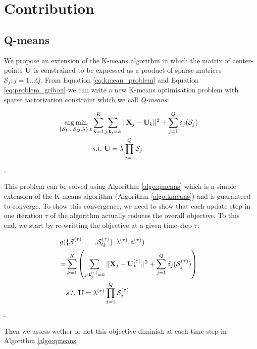 \section{Contribution}
\label{sec:contribution}
\subsection{Q-means}

We propose an extension of the K-means algorithm in which the matrix of center-points ${\mathbf{U}}$ is constrained to be expressed as a product of sparse matrices $\mathcal{S}_j: j = 1 \ldots Q$. From Equation \ref{eq:kmean_problem} and Equation \ref{eq:problem_gribon} we can write a new K-means optimisation problem with sparse factorization constraint which we call \textit{Q-means}:

\begin{equation}
\begin{split}
\label{eq:qmean_problem}
    \operatorname*{arg\,min}_{\{\mathcal{S}_1 \dots \mathcal{S}_Q, \lambda\}, {\mathbf{t}}} & \sum_{k=1}^{K} \sum_{j: {\mathbf{t}}_j = k} ||{\mathbf{X}}_j -{\mathbf{U}}_k||^2 + \sum_{j=1}^{Q} \delta_j(\mathcal{S}_j) \\
    & s.t. ~ {\mathbf{U}} = \lambda \prod_{j=1}^{Q}{\mathcal{S}_j}
\end{split}
\end{equation}.

This problem can be solved using Algorithm \ref{algo:qmeans} which is a simple extension of the K-means algorithm (Algorithm \ref{algo:kmeans}) and is guaranteed to converge. To show this convergence, we need to show that each update step in one iteration $\tau$ of the algorithm actually reduces the overall objective. To this end, we start by re-writting the objective at a given time-step $\tau$:

\begin{equation}
\begin{split}
\label{eq:qmean_problem_2}
    g(&\{ \mathcal{S}_1^{(\tau)}, \ldots,\mathcal{S}_Q^{(\tau)} \}, \lambda^{(\tau)}, {\mathbf{t}}^{(\tau)})\\
    = & \sum_{k=1}^{K} \left( \sum_{j: {\mathbf{t}}^{(\tau)}_j = k} ||{\mathbf{X}}_j - {\mathbf{U}}^{(\tau)}_k||^2 + \sum_{j=1}^{Q} \delta_j(\mathcal{S}_j^{(\tau)}) \right)\\
    & s.t. ~ {\mathbf{U}} = \lambda^{(\tau)} \prod_{j=1}^{Q}{\mathcal{S}_j^{(\tau)}}
\end{split}
\end{equation}.

Then we assess wether or not this objective diminish at each time-step in Algorithm \ref{algo:qmeans}.

